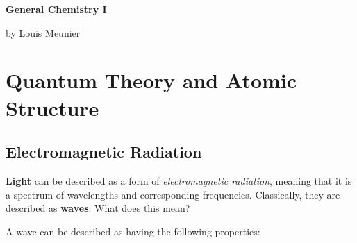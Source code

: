 \documentclass[12pt]{article}
\begin{document}
\newcommand{\red}[1]{\textcolor{red}{#1}}
\newcommand{\ddx}{\frac{d}{dx}}
\newcommand{\ddy}{\frac{d}{dy}}
\newcommand{\dxdy}{\frac{dx}{dy}}
\newcommand{\dydx}{\frac{dy}{dx}}

\newcommand{\real}{\mathbb{R}}
\newcommand{\naturals}{\mathbb{N}}
\newcommand{\integers}{\mathbb{Z}}
\newcommand{\rational}{\mathbb{Q}}
\newcommand{\complex}{\mathbb{C}}

\begin{titlepage}
    \begin{center}
        \vspace*{1cm}
        \Huge
        \textbf{General Chemistry I}
        
        \vfill
        
        \begin{figure}[!ht]
            \centering
        \end{figure}
        \vfill
        
        \small
        by Louis Meunier
        
        \href{https://notes.louismeunier.net}{\color{violet}{notes.louismeunier.net}}
        
    \end{center}
\end{titlepage}


{
  \hypersetup{linkcolor=violet}
  \tableofcontents
}

\newpage

\section{Quantum Theory and Atomic Structure}

\subsection{Electromagnetic Radiation}

\textbf{Light} can be described as a form of \textit{electromagnetic radiation}, meaning that it is a spectrum of wavelengths and corresponding frequencies. Classically, they are described as \textbf{waves}. What does this mean? 

A wave can be described as having the following properties:
\end{document}
